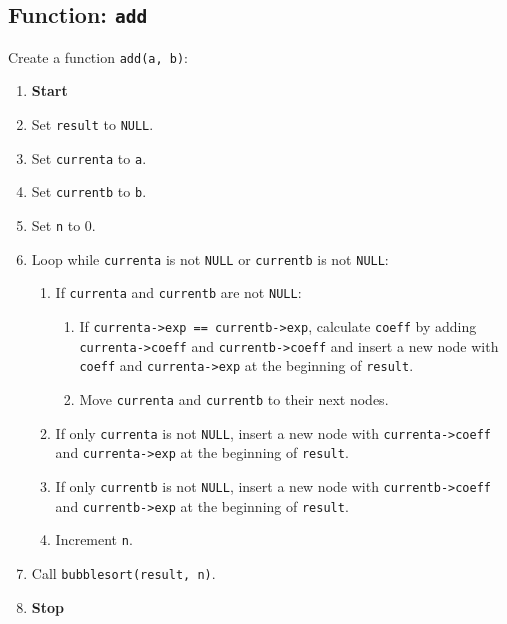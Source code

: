 {  \subsection{Function: \texttt{add}}
  Create a function \texttt{add(a, b)}:
  \begin{enumerate}[label=\arabic*:,left=0pt]
    \item \textbf{Start}
    \item Set \texttt{result} to \texttt{NULL}.
    \item Set \texttt{currenta} to \texttt{a}.
    \item Set \texttt{currentb} to \texttt{b}.
    \item Set \texttt{n} to 0.
    \item Loop while \texttt{currenta} is not \texttt{NULL} or \texttt{currentb} is not \texttt{NULL}:
          \begin{enumerate}[label=2.\arabic*:, start=1]
            \item If \texttt{currenta} and \texttt{currentb} are not \texttt{NULL}:
                  \begin{enumerate}[label=2.2.\arabic*:, start=1]
                    \item If \texttt{currenta->exp == currentb->exp}, calculate \texttt{coeff} by adding \texttt{currenta->coeff} and \texttt{currentb->coeff} and insert a new node with \texttt{coeff} and \texttt{currenta->exp} at the beginning of \texttt{result}.
                    \item Move \texttt{currenta} and \texttt{currentb} to their next nodes.
                  \end{enumerate}
            \item If only \texttt{currenta} is not \texttt{NULL}, insert a new node with \texttt{currenta->coeff} and \texttt{currenta->exp} at the beginning of \texttt{result}.
            \item If only \texttt{currentb} is not \texttt{NULL}, insert a new node with \texttt{currentb->coeff} and \texttt{currentb->exp} at the beginning of \texttt{result}.
            \item Increment \texttt{n}.
          \end{enumerate}
    \item Call \texttt{bubblesort(result, n)}.
    \item \textbf{Stop}
  \end{enumerate}

}
